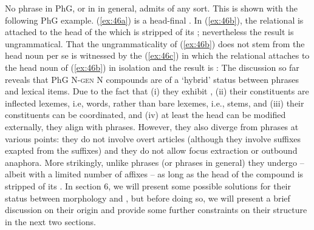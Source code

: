 \documentclass[output=paper]{LSP/langsci}
\begin{document}
\ea\label{ex:45}
	\z
\z
No phrase in PhG, or in  in general, admits  of any sort. This is shown with the following PhG example. (\ref{ex:46a}) is a head-final . In (\ref{ex:46b}), the relational  is attached to the head of the  which is stripped of its ; nevertheless the result is ungrammatical. That the ungrammaticality of (\ref{ex:46b}) does not stem from the head noun per se is witnessed by the  (\ref{ex:46c}) in which the relational  attaches to the head noun of (\ref{ex:46b}) in isolation and the result is :
\ea\label{ex:46}
	\z
\z
The discussion so far reveals that PhG N-\textsc{gen} N compounds are of a `hybrid' status between phrases and lexical items. Due to the fact that (i)  they exhibit , (ii) their constituents are inflected lexemes, i.e, words, rather than bare lexemes, i.e., stems, and (iii) their constituents can be coordinated, and (iv) at least the head can be modified externally, they align with  phrases. However, they also diverge from  phrases at various points: they do not involve overt  articles (although they involve suffixes exapted from the  suffixes) and they do not allow focus extraction or outbound anaphora. More strikingly, unlike  phrases (or phrases in general) they undergo  -- albeit with a limited number of affixes -- as long as the head of the compound is stripped of its . In section 6, we will present some possible solutions for their status between morphology and , but before doing so, we will present a brief discussion on their origin and provide some further constraints on their structure in the next two sections.
\end{document}
